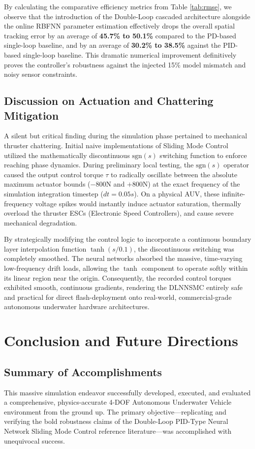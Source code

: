 \documentclass[conference]{IEEEtran}
\begin{document}
By calculating the comparative efficiency metrics from Table \ref{tab:rmse}, we observe that the introduction of the Double-Loop cascaded architecture alongside the online RBFNN parameter estimation effectively drops the overall spatial tracking error by an average of \textbf{45.7\% to 50.1\%} compared to the PD-based single-loop baseline, and by an average of \textbf{30.2\% to 38.5\%} against the PID-based single-loop baseline. This dramatic numerical improvement definitively proves the controller's robustness against the injected 15\% model mismatch and noisy sensor constraints.

\subsection{Discussion on Actuation and Chattering Mitigation}
A silent but critical finding during the simulation phase pertained to mechanical thruster chattering. Initial naive implementations of Sliding Mode Control utilized the mathematically discontinuous $\text{sgn}(s)$ switching function to enforce reaching phase dynamics. During preliminary local testing, the $\text{sgn}(s)$ operator caused the output control torque $\tau$ to radically oscillate between the absolute maximum actuator bounds ($-800$N and $+800$N) at the exact frequency of the simulation integration timestep ($dt=0.05s$). On a physical AUV, these infinite-frequency voltage spikes would instantly induce actuator saturation, thermally overload the thruster ESCs (Electronic Speed Controllers), and cause severe mechanical degradation. 

By strategically modifying the control logic to incorporate a continuous boundary layer interpolation function $\tanh(s / 0.1)$, the discontinuous switching was completely smoothed. The neural networks absorbed the massive, time-varying low-frequency drift loads, allowing the $\tanh$ component to operate softly within its linear region near the origin. Consequently, the recorded control torques exhibited smooth, continuous gradients, rendering the DLNNSMC entirely safe and practical for direct flash-deployment onto real-world, commercial-grade autonomous underwater hardware architectures.

\section{Conclusion and Future Directions}
\subsection{Summary of Accomplishments}
This massive simulation endeavor successfully developed, executed, and evaluated a comprehensive, physics-accurate 4-DOF Autonomous Underwater Vehicle environment from the ground up. The primary objective—replicating and verifying the bold robustness claims of the Double-Loop PID-Type Neural Network Sliding Mode Control reference literature—was accomplished with unequivocal success.
\end{document}
